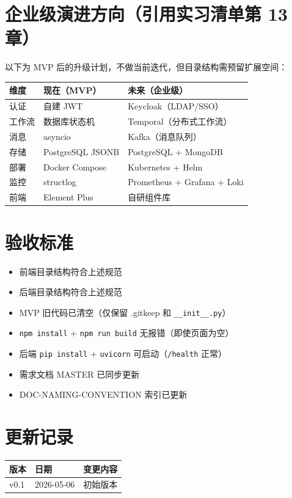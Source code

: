\documentclass[11pt,a4paper]{article}
\begin{document}
\section{企业级演进方向（引用实习清单第 13 章）}

以下为 MVP 后的升级计划，不做当前迭代，但目录结构需预留扩展空间：

\begin{table}[h]
\centering
\begin{tabularx}{\linewidth}{llX}
\toprule
\textbf{维度} & \textbf{现在（MVP）} & \textbf{未来（企业级）} \\
\midrule
认证 & 自建 JWT & Keycloak（LDAP/SSO） \\
工作流 & 数据库状态机 & Temporal（分布式工作流） \\
消息 & asyncio & Kafka（消息队列） \\
存储 & PostgreSQL JSONB & PostgreSQL + MongoDB \\
部署 & Docker Compose & Kubernetes + Helm \\
监控 & structlog & Prometheus + Grafana + Loki \\
前端 & Element Plus & 自研组件库 \\
\bottomrule
\end{tabularx}
\end{table}

\section{验收标准}

\begin{itemize}
  \item[$\square$] 前端目录结构符合上述规范
  \item[$\square$] 后端目录结构符合上述规范
  \item[$\square$] MVP 旧代码已清空（仅保留 .gitkeep 和 \texttt{\_\_init\_\_.py}）
  \item[$\square$] \texttt{npm install} + \texttt{npm run build} 无报错（即使页面为空）
  \item[$\square$] 后端 \texttt{pip install} + \texttt{uvicorn} 可启动（\texttt{/health} 正常）
  \item[$\square$] 需求文档 MASTER 已同步更新
  \item[$\square$] DOC-NAMING-CONVENTION 索引已更新
\end{itemize}

\section*{更新记录}

\begin{tabular}{lll}
\toprule
版本 & 日期 & 变更内容 \\
\midrule
v0.1 & 2026-05-06 & 初始版本 \\
\bottomrule
\end{tabular}
\end{document}
